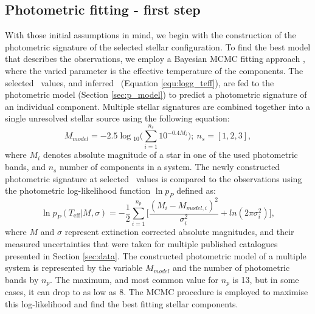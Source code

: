 \subsection{Photometric fitting - first step}
\label{sec:photo_fit}
With those initial assumptions in mind, we begin with the construction of the photometric signature of the selected stellar configuration. To find the best model that describes the observations, we employ a Bayesian MCMC fitting approach \citep{2013PASP..125..306F}, where the varied parameter is the effective temperature of the components. The selected \Teff\ values, and inferred \Logg\ (Equation \ref{equ:logg_teff}), are fed to the photometric model (Section \ref{sec:p_model}) to predict a photometric signature of an individual component. Multiple stellar signatures are combined together into a single unresolved stellar source using the following equation:
\begin{equation}
	M_{model} = -2.5 \log{}_{10} \Big( \sum_{i=1}^{n_s} 10^{-0.4 M_i} \Big); \ n_s=[1, 2, 3],
\end{equation}
where $M_i$ denotes absolute magnitude of a star in one of the used photometric bands, and $n_s$ number of components in a system. The newly constructed photometric signature at selected \Teff\ values is compared to the observations using the photometric log-likelihood function $\ln p_{P}$ defined as:
\begin{equation}
	\label{equ:lnp_p}
	\ln p_{P}(T_\mathrm{eff} | M, \sigma) = -\frac{1}{2} \sum_{i=1}^{n_p} \Big[ \frac{(M_i - M_{model, i})^2}{\sigma_i^2} +ln(2\pi\sigma_i^2) \Big],
\end{equation}
where $M$ and $\sigma$ represent extinction corrected absolute magnitudes, and their measured uncertainties that were taken for multiple published catalogues presented in Section \ref{sec:data}. The constructed photometric model of a multiple system is represented by the variable $M_{model}$ and the number of photometric bands by $n_p$. The maximum, and most common value for $n_p$ is 13, but in some cases, it can drop to as low as 8. The MCMC procedure is employed to maximise this log-likelihood and find the best fitting stellar components.

